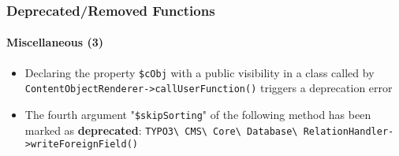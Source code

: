%

\begin{frame}[fragile]
	\frametitle{Deprecated/Removed Functions}
	\framesubtitle{Miscellaneous (3)}


	\begin{itemize}
		\item Declaring the property \texttt{\$cObj} with a public visibility in
			a class called by \texttt{ContentObjectRenderer->callUserFunction()}
			triggers a deprecation error
		\item The fourth argument "\texttt{\$skipSorting}" of the following
			method has been marked as \textbf{deprecated}:
			\small\texttt{TYPO3\textbackslash
				CMS\textbackslash
				Core\textbackslash
				Database\textbackslash
				RelationHandler->writeForeignField()}\normalsize
	\end{itemize}

\end{frame}

